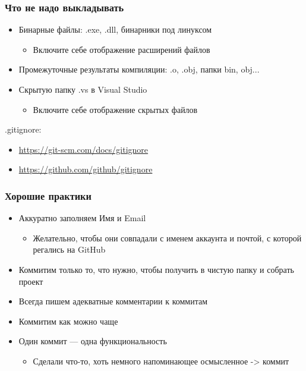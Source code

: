 \documentclass[xetex,mathserif,serif]{beamer}
\begin{document}
    \begin{frame}
        \frametitle{Что не надо выкладывать}
        \begin{itemize}
            \item Бинарные файлы: .exe, .dll, бинарники под линуксом
            \begin{itemize}
                \item Включите себе отображение расширений файлов
            \end{itemize}
            \item Промежуточные результаты компиляции: .o, .obj, папки bin, obj...
            \item Скрытую папку .vs в Visual Studio
            \begin{itemize}
                \item Включите себе отображение скрытых файлов
            \end{itemize}
        \end{itemize}
        .gitignore:
        \begin{itemize}
            \item \url{https://git-scm.com/docs/gitignore}
            \item \url{https://github.com/github/gitignore}
        \end{itemize}
    \end{frame}

    \begin{frame}
        \frametitle{Хорошие практики}
        \begin{itemize}
            \item Аккуратно заполняем Имя и Email
            \begin{itemize}
                \item Желательно, чтобы они совпадали с именем аккаунта и почтой, с которой регались на GitHub
            \end{itemize}
            \item Коммитим только то, что нужно, чтобы получить в чистую папку и собрать проект
            \item Всегда пишем адекватные комментарии к коммитам
            \item Коммитим как можно чаще
            \item Один коммит --- одна функциональность
            \begin{itemize}
                \item Сделали что-то, хоть немного напоминающее осмысленное -> коммит
            \end{itemize}
        \end{itemize}
    \end{frame}
\end{document}
